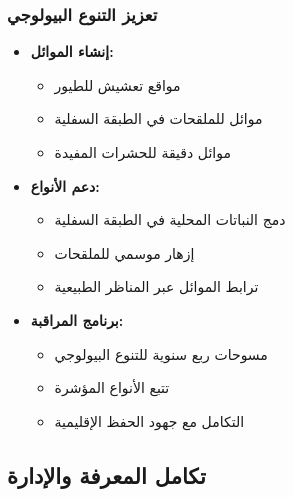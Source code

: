 \subsubsection{تعزيز التنوع البيولوجي}
\begin{itemize}
    \item \textbf{إنشاء الموائل:}
    \begin{itemize}
        \item مواقع تعشيش للطيور
        \item موائل للملقحات في الطبقة السفلية
        \item موائل دقيقة للحشرات المفيدة
    \end{itemize}
    \item \textbf{دعم الأنواع:}
    \begin{itemize}
        \item دمج النباتات المحلية في الطبقة السفلية
        \item إزهار موسمي للملقحات
        \item ترابط الموائل عبر المناظر الطبيعية
    \end{itemize}
    \item \textbf{برنامج المراقبة:}
    \begin{itemize}
        \item مسوحات ربع سنوية للتنوع البيولوجي
        \item تتبع الأنواع المؤشرة
        \item التكامل مع جهود الحفظ الإقليمية
    \end{itemize}
\end{itemize}

\subsection{تكامل المعرفة والإدارة}

